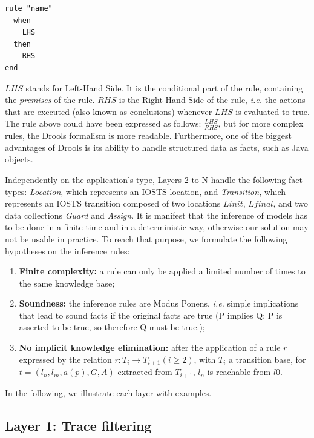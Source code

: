 \begin{BVerbatim}
rule "name"
  when
    LHS
  then
    RHS
end
\end{BVerbatim}

$LHS$ stands for Left-Hand Side. It is the conditional part of
the rule, containing the \emph{premises} of the rule. $RHS$ is
the Right-Hand Side of the rule, \emph{i.e.} the actions that are
executed (also known as conclusions) whenever $LHS$ is evaluated
to true. The rule above could have been expressed as follows:
$\frac{LHS}{RHS}$, but for more complex rules, the Drools
formalism is more readable. Furthermore, one of the biggest
advantages of Drools is its ability to handle structured data as
facts, such as Java objects.

Independently on the application's type, Layers 2 to N handle the
following fact types: \textit{Location}, which represents an
IOSTS location, and \textit{Transition}, which represents an
IOSTS transition composed of two locations $Linit$, $Lfinal$,
and two data collections \textit{Guard} and \textit{Assign}. It
is manifest that the inference of models has to be done in a
finite time and in a deterministic way, otherwise our solution
may not be usable in practice. To reach that purpose, we
formulate the following hypotheses on the inference rules:

\begin{enumerate}
    \item \textbf{Finite complexity:} a rule can only be applied
        a limited number of times to the same knowledge base;

    \item \textbf{Soundness:} the inference rules are Modus
        Ponens, \emph{i.e.} simple implications that lead to
        sound facts if the original facts are true (P implies Q;
        P is asserted to be true, so therefore Q must be true.);

    \item \textbf{No implicit knowledge elimination:} after the
        application of a rule $r$ expressed by the relation $r:
        T_i \rightarrow T_{i+1} (i\geq 2)$, with $T_i$ a
        transition base, for $t=(l_n,l_m,a(p),G,A)$ extracted
        from $T_{i+1}$, $l_n$ is reachable from $l0$.
\end{enumerate}

In the following, we illustrate each layer with examples.

\subsection{Layer 1: Trace filtering}
\label{sec:modelinf:webapps:L1}

